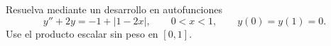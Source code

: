 Resuelva mediante un desarrollo en autofunciones
\[y''+2y=-1+|1-2x|,\qquad0<x<1,\qquad y(0)=y(1)=0.\]
Use el producto escalar sin peso en $[0,1]$.
